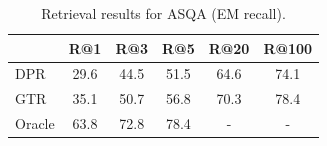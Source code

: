 \begin{table}[t]
    \centering
    \small
    \begin{tabular}{@{}lccccc@{}}
    \toprule
     & R@1 & R@3 & R@5 & R@20 & R@100 \\ \midrule
    DPR & 29.6 & 44.5 & 51.5 & 64.6 & 74.1 \\
    GTR & 35.1 & 50.7 & 56.8 & {70.3} & {78.4} \\
    Oracle & 63.8 & 72.8 & 78.4 & - & - \\
    \bottomrule
    \end{tabular}
    \caption{Retrieval results for ASQA (EM recall).}
    \label{tab:retrieval-asqa}
\end{table}